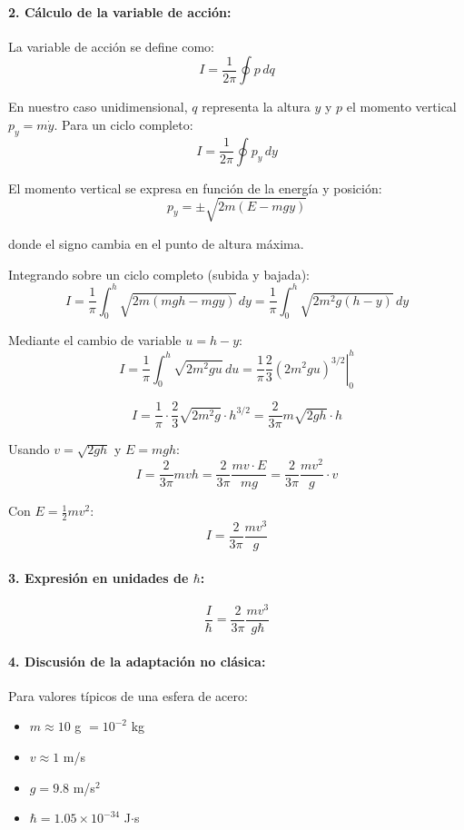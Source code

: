 \documentclass[12pt]{article}
\begin{document}
\begin{enumerate}
  \paragraph{2. Cálculo de la variable de acción:}
  La variable de acción se define como:
  \[
  I = \frac{1}{2\pi}\oint p\,dq
  \]

  En nuestro caso unidimensional, $q$ representa la altura $y$ y $p$ el momento vertical $p_y = m\dot{y}$. Para un ciclo completo:
  \[
  I = \frac{1}{2\pi}\oint p_y\,dy
  \]

  El momento vertical se expresa en función de la energía y posición:
  \[
  p_y = \pm\sqrt{2m(E-mgy)}
  \]

  donde el signo cambia en el punto de altura máxima.

  Integrando sobre un ciclo completo (subida y bajada):
  \[
  I = \frac{1}{\pi}\int_0^h \sqrt{2m(mgh-mgy)}\,dy = \frac{1}{\pi}\int_0^h \sqrt{2m^2g(h-y)}\,dy
  \]

  Mediante el cambio de variable $u = h-y$:
  \[
  I = \frac{1}{\pi}\int_0^h \sqrt{2m^2gu}\,du = \frac{1}{\pi}\left.\frac{2}{3}(2m^2gu)^{3/2}\right|_0^h
  \]

  \[
  I = \frac{1}{\pi}\cdot\frac{2}{3}\sqrt{2m^2g}·h^{3/2} = \frac{2}{3\pi}m\sqrt{2gh}·h
  \]

  Usando $v = \sqrt{2gh}$ y $E = mgh$:
  \[
  I = \frac{2}{3\pi}mvh = \frac{2}{3\pi}\frac{mv·E}{mg} = \frac{2}{3\pi}\frac{mv^2}{g}·v
  \]

  Con $E = \frac{1}{2}mv^2$:
  \[
  I = \frac{2}{3\pi}\frac{mv^3}{g}
  \]

  \paragraph{3. Expresión en unidades de $\hbar$:}
  \[
  \frac{I}{\hbar} = \frac{2}{3\pi}\frac{mv^3}{g\hbar}
  \]

  \paragraph{4. Discusión de la adaptación no clásica:}
  Para valores típicos de una esfera de acero:
  \begin{itemize}
  \item $m \approx 10$ g $= 10^{-2}$ kg
  \item $v \approx 1$ m/s
  \item $g = 9.8$ m/s$^2$
  \item $\hbar = 1.05 \times 10^{-34}$ J$\cdot$s
  \end{itemize}


\end{enumerate}
\end{document}
